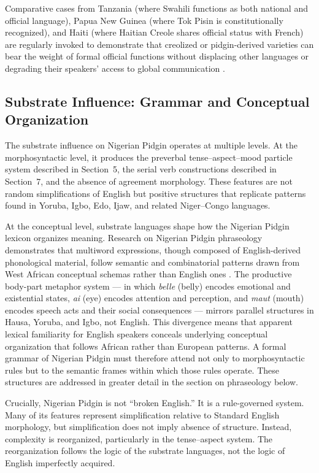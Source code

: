 \documentclass[12pt]{article}
\begin{document}
Comparative cases from Tanzania (where Swahili functions as both national and official language), Papua New Guinea (where Tok Pisin is constitutionally recognized), and Haiti (where Haitian Creole shares official status with French) are regularly invoked to demonstrate that creolized or pidgin-derived varieties can bear the weight of formal official functions without displacing other languages or degrading their speakers' access to global communication \cite{OjoKilani2020}.

\subsection{Substrate Influence: Grammar and Conceptual Organization}

The substrate influence on Nigerian Pidgin operates at multiple levels. At the morphosyntactic level, it produces the preverbal tense--aspect--mood particle system described in Section~5, the serial verb constructions described in Section~7, and the absence of agreement morphology. These features are not random simplifications of English but positive structures that replicate patterns found in Yoruba, Igbo, Edo, Ijaw, and related Niger--Congo languages.

At the conceptual level, substrate languages shape how the Nigerian Pidgin lexicon organizes meaning. Research on Nigerian Pidgin phraseology demonstrates that multiword expressions, though composed of English-derived phonological material, follow semantic and combinatorial patterns drawn from West African conceptual schemas rather than English ones \cite{Frackiewicz2019}. The productive body-part metaphor system --- in which \textit{belle} (belly) encodes emotional and existential states, \textit{ai} (eye) encodes attention and perception, and \textit{maut} (mouth) encodes speech acts and their social consequences --- mirrors parallel structures in Hausa, Yoruba, and Igbo, not English. This divergence means that apparent lexical familiarity for English speakers conceals underlying conceptual organization that follows African rather than European patterns. A formal grammar of Nigerian Pidgin must therefore attend not only to morphosyntactic rules but to the semantic frames within which those rules operate. These structures are addressed in greater detail in the section on phraseology below.

Crucially, Nigerian Pidgin is not ``broken English.'' It is a rule-governed system. Many of its features represent simplification relative to Standard English morphology, but simplification does not imply absence of structure. Instead, complexity is reorganized, particularly in the tense--aspect system. The reorganization follows the logic of the substrate languages, not the logic of English imperfectly acquired.
\end{document}
